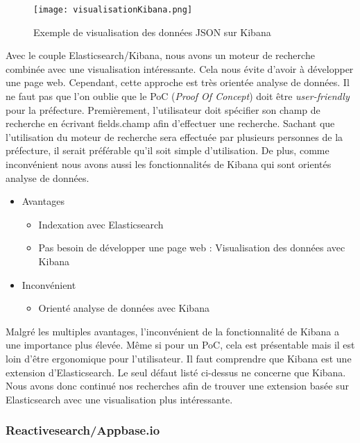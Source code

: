 \begin{figure}[h!]
  \centering
  \texttt{[image: visualisationKibana.png]}
	\caption[]{Exemple de visualisation des données JSON sur Kibana}
  \label{}
\end{figure}


Avec le couple Elasticsearch/Kibana, nous avons un moteur de recherche combinée avec une visualisation intéressante. Cela nous évite d’avoir à développer une page web. 
Cependant, cette approche est très orientée analyse de données.
Il ne faut pas que l’on oublie que le PoC (\textit{Proof Of Concept}) doit être \textit{user-friendly} pour la préfecture.
Premièrement, l’utilisateur doit spécifier son champ de recherche en écrivant fields.champ afin d’effectuer une recherche.
Sachant que l’utilisation du moteur de recherche sera effectuée par plusieurs personnes de la préfecture, il serait préférable qu'il soit simple d’utilisation.
De plus, comme inconvénient nous avons aussi les fonctionnalités de Kibana qui sont orientés analyse de données.

\begin{itemize}
    \item Avantages 
        \begin{itemize}
            \item Indexation avec Elasticsearch
            \item Pas besoin de développer une page web : Visualisation des données avec Kibana
        \end{itemize}
    \item Inconvénient 
        \begin{itemize}
        \item Orienté analyse de données avec Kibana
        \end{itemize}
\end{itemize}

Malgré les multiples avantages, l’inconvénient de la fonctionnalité de Kibana a une importance plus élevée.
Même si pour un PoC, cela est présentable mais il est loin d’être ergonomique pour l’utilisateur.
Il faut comprendre que Kibana est une extension d’Elasticsearch.
Le seul défaut listé ci-dessus ne concerne que Kibana.
Nous avons donc continué nos recherches afin de trouver une extension basée sur Elasticsearch avec une visualisation plus intéressante.

\subsubsection{Reactivesearch/Appbase.io}

